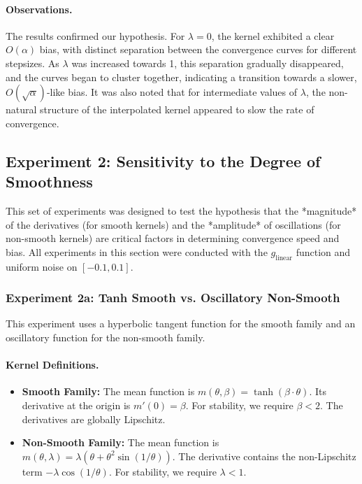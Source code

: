 \documentclass[a4paper]{article}
\begin{document}
\paragraph{Observations.} The results confirmed our hypothesis. For \(\lambda=0\), the kernel exhibited a clear \(O(\alpha)\) bias, with distinct separation between the convergence curves for different stepsizes. As \(\lambda\) was increased towards 1, this separation gradually disappeared, and the curves began to cluster together, indicating a transition towards a slower, \(O(\sqrt{\alpha})\)-like bias. It was also noted that for intermediate values of \(\lambda\), the non-natural structure of the interpolated kernel appeared to slow the rate of convergence.

\subsection*{Experiment 2: Sensitivity to the Degree of Smoothness}
This set of experiments was designed to test the hypothesis that the *magnitude* of the derivatives (for smooth kernels) and the *amplitude* of oscillations (for non-smooth kernels) are critical factors in determining convergence speed and bias. All experiments in this section were conducted with the \(g_{\text{linear}}\) function and uniform noise on \([-0.1, 0.1]\).

\subsubsection*{Experiment 2a: Tanh Smooth vs. Oscillatory Non-Smooth}
This experiment uses a hyperbolic tangent function for the smooth family and an oscillatory function for the non-smooth family.

\paragraph{Kernel Definitions.}
\begin{itemize}
	\item \textbf{Smooth Family:} The mean function is \(m(\theta, \beta) = \tanh(\beta \cdot \theta)\). Its derivative at the origin is \(m'(0) = \beta\). For stability, we require \(\beta < 2\). The derivatives are globally Lipschitz.
	\item \textbf{Non-Smooth Family:} The mean function is \(m(\theta, \lambda) = \lambda(\theta + \theta^2\sin(1/\theta))\). The derivative contains the non-Lipschitz term \(-\lambda\cos(1/\theta)\). For stability, we require \(\lambda < 1\).
\end{itemize}
\end{document}
